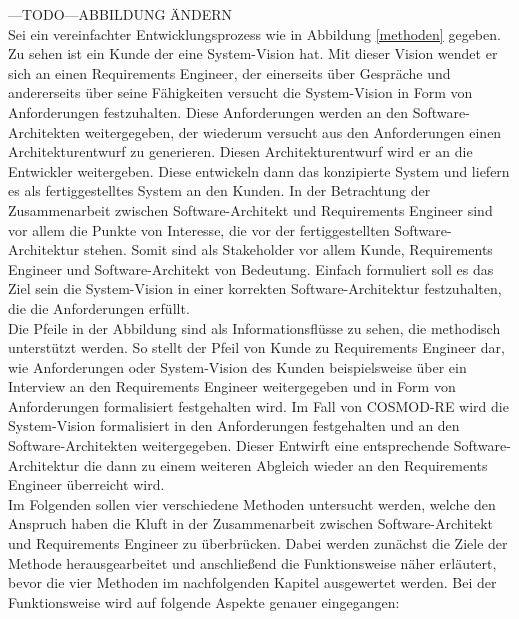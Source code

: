 ---TODO---ABBILDUNG ÄNDERN\\

Sei ein vereinfachter Entwicklungsprozess wie in Abbildung \ref{methoden} gegeben. Zu sehen ist ein Kunde der eine System-Vision hat. Mit dieser Vision wendet er sich an einen Requirements Engineer, der einerseits \"uber Gespr\"ache und andererseits \"uber seine F\"ahigkeiten versucht die System-Vision in Form von Anforderungen festzuhalten. Diese Anforderungen werden an den Software-Architekten weitergegeben, der wiederum versucht aus den Anforderungen einen Architekturentwurf zu generieren. Diesen Architekturentwurf wird er an die Entwickler weitergeben. Diese entwickeln dann das konzipierte System und liefern es als fertiggestelltes System an den Kunden. In der Betrachtung der Zusammenarbeit zwischen Software-Architekt und Requirements Engineer sind vor allem die Punkte von Interesse, die vor der fertiggestellten Software-Architektur stehen. Somit sind als Stakeholder vor allem Kunde, Requirements Engineer und Software-Architekt von Bedeutung. Einfach formuliert soll es das Ziel sein die System-Vision in einer korrekten Software-Architektur festzuhalten, die die Anforderungen erfüllt.\\

Die Pfeile in der Abbildung sind als Informationsflüsse zu sehen, die methodisch unterstützt werden. So stellt der Pfeil von Kunde zu Requirements Engineer dar, wie Anforderungen oder System-Vision des Kunden beispielsweise über ein Interview an den Requirements Engineer weitergegeben und in Form von Anforderungen formalisiert festgehalten wird. Im Fall von COSMOD-RE wird die System-Vision formalisiert in den Anforderungen festgehalten und an den Software-Architekten weitergegeben. Dieser Entwirft eine entsprechende Software-Architektur die dann zu einem weiteren Abgleich wieder an den Requirements Engineer überreicht wird. \\

Im Folgenden sollen vier verschiedene Methoden untersucht werden, welche den Anspruch haben die Kluft in der Zusammenarbeit zwischen Software-Architekt und Requirements Engineer zu \"uberbr\"ucken. Dabei werden zun\"achst die Ziele der Methode herausgearbeitet und anschlie\ss{}end die Funktionsweise n\"aher erl\"autert, bevor die vier Methoden im nachfolgenden Kapitel ausgewertet werden. Bei der Funktionsweise wird auf folgende Aspekte genauer eingegangen: \\

